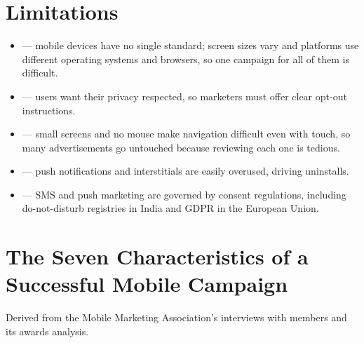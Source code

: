 \section{Limitations}

\begin{warnbox}
\begin{itemize}
\item {} --- mobile devices have no single standard;
      screen sizes vary and platforms use different operating systems and
      browsers, so one campaign for all of them is difficult.
\item {} --- users want their privacy respected, so marketers
      must offer clear opt-out instructions.
\item {} --- small screens and no mouse make
      navigation difficult even with touch, so many advertisements go untouched
      because reviewing each one is tedious.
\item {} --- push notifications and interstitials
      are easily overused, driving uninstalls.
\item {} --- SMS and push marketing are governed by
      consent regulations, including do-not-disturb registries in India and GDPR
      in the European Union.
\end{itemize}
\end{warnbox}

\section{The Seven Characteristics of a Successful Mobile Campaign}

Derived from the Mobile Marketing Association's interviews with members and its
awards analysis.

